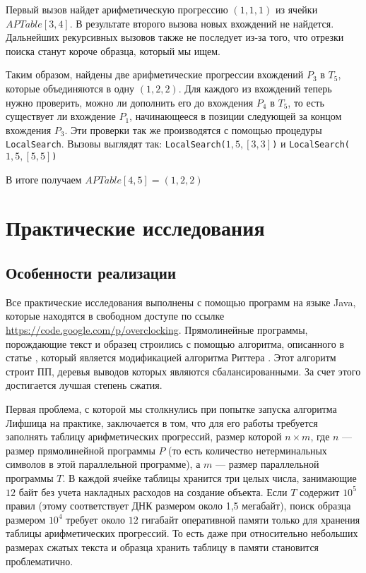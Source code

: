 \documentclass[14pt]{article}
\begin{document}
Первый вызов найдет арифметическую прогрессию $(1, 1, 1)$ из ячейки $APTable[3, 4]$. В результате второго вызова новых
вхождений не найдется.
Дальнейших рекурсивных вызовов также не последует из-за того, что отрезки поиска станут короче образца, который мы ищем.

Таким образом, найдены две арифметические прогрессии вхождений $P_3$ в $T_5$, которые
объединяются в одну $(1, 2, 2)$.
Для каждого из вхождений теперь нужно проверить, можно ли дополнить его до вхождения $P_4$ в $T_5$, то есть
существует ли вхождение $P_1$, начинающееся в позиции следующей за концом вхождения $P_3$.
Эти проверки так же производятся с помощью процедуры \texttt{LocalSearch}. Вызовы выглядят так:
\texttt{LocalSearch($1, 5, [3, 3]$)} и \texttt{LocalSearch($1, 5, [5, 5]$)}

В итоге получаем $APTable[4, 5] = (1, 2, 2)$

\section{Практические исследования}
\subsection{Особенности реализации}

Все практические исследования выполнены с помощью программ на языке Java, которые находятся в свободном доступе
по ссылке \url{https://code.google.com/p/overclocking}. 
Прямолинейные программы, порождающие текст и образец строились с помощью алгоритма, описанного в статье \cite{usu}, который
является модификацией алгоритма Риттера \cite{Ritter}. Этот алгоритм строит ПП, деревья выводов которых являются сбалансированными. 
За счет этого достигается лучшая степень сжатия.

Первая проблема, с которой мы столкнулись при попытке запуска алгоритма Лифшица на практике, заключается в том, что для его работы требуется заполнять таблицу арифметических прогрессий, размер которой $n\times m$, где $n$ ---  размер прямолинейной программы $P$ (то есть количество нетерминальных символов в этой параллельной программе), а $m$ --- размер параллельной программы $T$. В каждой ячейке таблицы хранится три целых числа, занимающие $12$ байт без учета накладных расходов на создание объекта. Если $T$ содержит $10^5$ правил
(этому соответствует ДНК размером около 1,5 мегабайт), поиск образца размером $10^4$ требует около $12$ гигабайт оперативной памяти только для хранения таблицы арифметических прогрессий. То есть даже при относительно небольших размерах сжатых текста и образца хранить таблицу в памяти становится проблематично.
\end{document}
